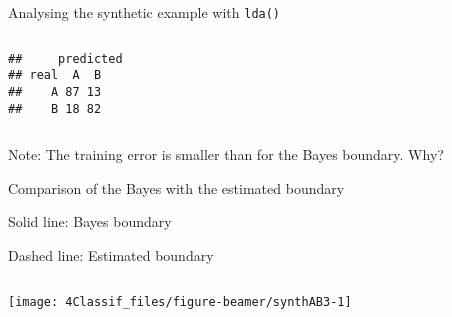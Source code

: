 \documentclass[10pt,ignorenonframetext,]{beamer}
\newenvironment{Shaded}{\begin{snugshade}}{\end{snugshade}}
\newcommand{\DataTypeTok}[1]{\textcolor[rgb]{0.13,0.29,0.53}{#1}}
\newcommand{\KeywordTok}[1]{\textcolor[rgb]{0.13,0.29,0.53}{\textbf{#1}}}
\newcommand{\NormalTok}[1]{#1}
\newcommand{\OperatorTok}[1]{\textcolor[rgb]{0.81,0.36,0.00}{\textbf{#1}}}
\newcommand{\StringTok}[1]{\textcolor[rgb]{0.31,0.60,0.02}{#1}}
\begin{document}
\begin{frame}[fragile]

\begin{block}{Analysing the synthetic example with \texttt{lda()}}

\(~\)

\scriptsize

\begin{Shaded}
\end{Shaded}

\begin{verbatim}
##     predicted
## real  A  B
##    A 87 13
##    B 18 82
\end{verbatim}

\(~\)

\normalsize

Note: The training error is smaller than for the Bayes boundary. Why?

\end{block}

\end{frame}

\begin{frame}

\begin{block}{Comparison of the Bayes with the estimated boundary}

\vspace{2mm}

Solid line: Bayes boundary

Dashed line: Estimated boundary

\(~\)

\begin{center}\texttt{[image: 4Classif\_files/figure-beamer/synthAB3-1]} \end{center}

\end{block}

\end{frame}
\end{document}

